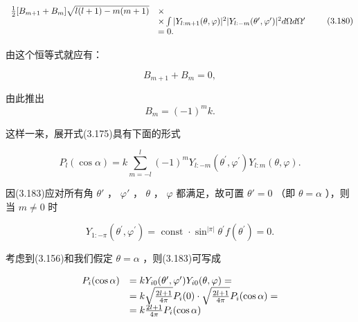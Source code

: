 \begin{equation*}
\begin{array}{r l} \frac {1}{2} [ B _ {m + 1} + B _ {m} ] \sqrt {l (l + 1) - m (m + 1)} & \times \\ & \times \int | Y _ {l: m + 1} (\theta , \varphi) | ^ {2} | Y _ {l: - m} (\theta^ {\prime}, \varphi^ {\prime}) | ^ {2} d \Omega d \Omega^ {\prime} \\ & = 0. \end{array} \tag{3.180}
\end{equation*}

由这个恒等式就应有：

\begin{equation*}
B _ {m + 1} + B _ {m} = 0,\tag{3.181}
\end{equation*}

由此推出
\begin{equation*}
B _ {m} = (- 1) ^ {m} k.\tag{3.182}
\end{equation*}

这样一来，展开式(3.175)具有下面的形式

\begin{equation*}
P _ {l} (\cos \alpha) = k \sum_ {m = - l} ^ {l} (- 1) ^ {m} Y _ {l: - m} \left(\theta^ {\prime}, \varphi^ {\prime}\right) Y _ {l: m} (\theta , \varphi).\tag{3.183}
\end{equation*}

因(3.183)应对所有角 $\theta'$ ， $\varphi'$ ， $\theta$ ， $\varphi$ 都满足，故可置 $\theta' = 0$ （即 $\theta = \alpha$ ），则当 $m \neq 0$ 时

\begin{equation*}
Y _ {1: - \pi} (\theta^ {\prime}, \varphi^ {\prime}) = \text { const } \cdot \sin^ {| \pi |} \theta^ {\prime} f (\theta^ {\prime}) = 0.
\end{equation*}

考虑到(3.156)和我们假定 $\theta = \alpha$ ，则(3.183)可写成

\begin{equation*}
\begin{array}{r l} P _ {i} (\cos \alpha) & = k Y _ {i 0} (\theta^ {\prime}, \varphi^ {\prime}) Y _ {i 0} (\theta , \varphi) = \\ & = k \sqrt {\frac {2 l + 1}{4 \pi}} P _ {i} (0) \cdot \sqrt {\frac {2 l + 1}{4 \pi}} P _ {i} (\cos \alpha) = \\ & = k \frac {2 l + 1}{4 \pi} P _ {i} (\cos \alpha) \end{array}
\end{equation*}

